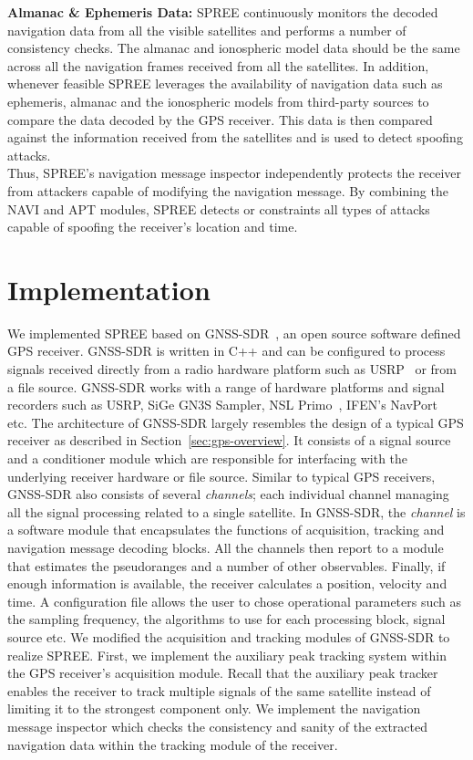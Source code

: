 \documentclass[letterpaper,twocolumn,10pt]{article}
\makeatletter
\newcommand{\etc}{etc.\@\xspace}
\newcommand{\rxname}{SPREE\xspace}
\makeatother
\begin{document}
\noindent\textbf{Almanac \& Ephemeris Data:} \rxname continuously monitors the decoded navigation data from all the visible satellites and performs a number of consistency checks. The almanac and ionospheric model data should be the same across all the navigation frames received from all the satellites. In addition, whenever feasible \rxname leverages the availability of navigation data such as ephemeris, almanac and the ionospheric models from third-party sources to compare the data decoded by the GPS receiver. This data is then compared against the information received from the satellites and is used to detect spoofing attacks.\\

Thus, \rxname 's navigation message inspector independently protects the receiver from attackers capable of modifying the navigation message. By combining the NAVI and APT modules, \rxname detects or constraints all types of  attacks capable of spoofing the receiver's location and time.



\section{Implementation}
\label{sec:implementation}

We implemented \rxname based on GNSS-SDR~\cite{GNSS-SDR11}, an open source software defined GPS receiver. GNSS-SDR is written in C++ and can be configured to process signals received directly from a radio hardware platform such as USRP~\cite{ettus_research} or from a file source. GNSS-SDR works with a range of hardware platforms and signal recorders such as USRP, SiGe GN3S Sampler, NSL Primo~\cite{nsl_primo}, IFEN's NavPort~\cite{ifen} etc. The architecture of GNSS-SDR largely resembles the design of a typical GPS receiver as described in Section~\ref{sec:gps-overview}. It consists of a signal source and a conditioner module which are responsible for interfacing with the underlying receiver hardware or file source. Similar to typical GPS receivers, GNSS-SDR also consists of several \textit{channels}; each individual channel managing all the signal processing related to a single satellite. In GNSS-SDR, the \textit{channel} is a software module that encapsulates the functions of acquisition, tracking and navigation message decoding blocks. All the channels then report to a module that estimates the pseudoranges and a number of other observables. Finally, if enough information is available, the receiver calculates a position, velocity and time. A configuration file allows the user to chose operational parameters such as the sampling frequency, the algorithms to use for each processing block, signal source \etc We modified the acquisition and tracking modules of GNSS-SDR to realize \rxname. First, we implement the auxiliary peak tracking system within the GPS receiver’s acquisition module. Recall that the auxiliary peak tracker enables the receiver to track multiple signals of the same satellite instead of limiting it to the strongest component only. We implement the navigation message inspector which checks the consistency and sanity of the extracted navigation data within the tracking module of the receiver.\\ 
\end{document}
